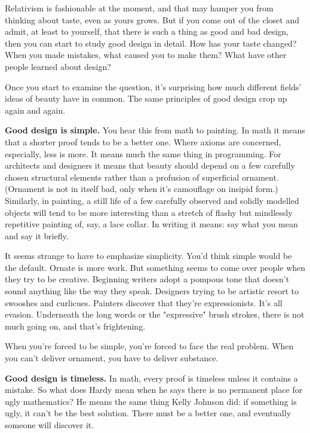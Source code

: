 Relativism is fashionable at the moment, and that may hamper
you from thinking about taste, even as yours grows.
But if you come out of the closet and admit, at least to yourself,
that there is such a thing as good and bad design, then you
can start to study good design in detail.
How has
your taste changed?  When you made mistakes, what
caused you to make them?  What have other people learned about
design?

Once you start to examine the question, it's surprising how
much different fields' ideas of beauty have in common.  The same
principles of good design crop up again and again.



\textbf{Good design is simple.}  You hear this from math to
painting.  In math it means that a shorter proof tends to be
a better one.  Where axioms are concerned, especially,
less is more.  It means much the same thing in programming.
For architects and designers it means that beauty should
depend on a few carefully chosen structural elements
rather than a profusion of superficial ornament.  (Ornament
is not in itself bad, only when it's camouflage on insipid
form.)  Similarly, in painting, a
still life of a few carefully observed and solidly
modelled objects will tend to be more interesting than a
stretch of flashy
but mindlessly repetitive painting of, say, a lace collar.
In writing it means: say what you mean
and say it briefly.

It seems strange to have to emphasize simplicity.
You'd think simple would be the default.  Ornate
is more work.  But something seems to come over people
when they try to be creative.  Beginning writers adopt   
a pompous tone that doesn't sound anything like the way 
they speak.  Designers trying to be artistic resort to
swooshes and curlicues.  Painters discover that they're expressionists.
It's all evasion.
Underneath
the long words or the "expressive" brush strokes, there
is not much going on, and that's frightening.

When you're
forced to be simple, you're forced to face the real problem.
When you can't deliver ornament, you have to deliver
substance.



\textbf{Good design is timeless.}
In math, every proof is timeless unless it contains a mistake.
So what does Hardy mean when he says there is no permanent 
place for ugly mathematics?  He means the same thing Kelly Johnson did:
if something is ugly, it can't be the best solution.  There
must be a better one, and eventually
someone will discover it.

